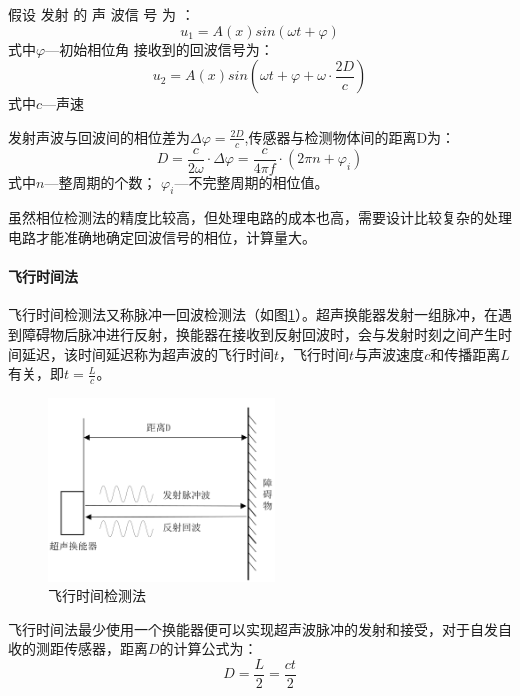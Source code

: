     假设 发射 的 声 波信 号 为 ：
    \begin{equation}
    	u_1=A(x)sin(\omega t + \varphi)
    \end{equation}
式中\quad$\varphi$---初始相位角
接收到的回波信号为：
\begin{equation}
	u_2=A(x)sin(\omega t + \varphi + \omega \cdot{\frac{2D}{c}})
\end{equation}
式中\quad$c$---声速\par
发射声波与回波间的相位差为$\Delta \varphi=\frac{2D}{c}$,传感器与检测物体间的距离D为：
\begin{equation}
	D=\frac{c}{2\omega}\cdot \Delta \varphi=\frac{c}{4\pi f}\cdot(2\pi n + \varphi_i)
\end{equation}
式中\quad$n$---整周期的个数；
\quad$\varphi_i$---不完整周期的相位值。\par
虽然相位检测法的精度比较高，但处理电路的成本也高，需要设计比较复杂的处理电路才能准确地确定回波信号的相位，计算量大。\par



    
    \paragraph{飞行时间法}
    飞行时间检测法又称脉冲一回波检测法（如图\ref{飞行时间检测法}）。超声换能器发射一组脉冲，在遇到障碍物后脉冲进行反射，换能器在接收到反射回波时，会与发射时刻之间产生时间延迟，该时间延迟称为超声波的飞行时间$t$，飞行时间$t$与声波速度$c$和传播距离$L$有关，即$t=\frac{L}{c}$。
    \begin{figure}[!h]
    	\centering
    	\includegraphics[width=6cm]{figure/飞行时间检测法.png}
    	\caption{飞行时间检测法}
    	\label{飞行时间检测法}
    \end{figure}\par
    飞行时间法最少使用一个换能器便可以实现超声波脉冲的发射和接受，对于自发自收的测距传感器，距离$D$的计算公式为：
    \begin{equation}
    	D=\frac{L}{2}=\frac{ct}{2}
    \end{equation}\par


